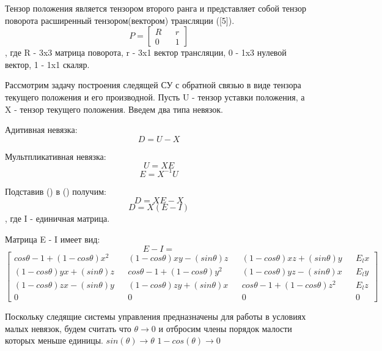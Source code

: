 \documentclass[a4paper]{article}
\begin{document}
Тензор положения является тензором второго ранга и представляет собой тензор поворота расширенный тензором(вектором) трансляции ([5]).
\begin{equation}
P = \begin{bmatrix}R&&r\\0&&1\end{bmatrix}
\end{equation}
, где R - 3x3 матрица поворота, r - 3x1 вектор трансляции, 0 - 1x3 нулевой вектор, 1 - 1x1 скаляр.  

Рассмотрим задачу построения следящей СУ с обратной связью в виде тензора текущего положения и его производной. 
Пусть U - тензор уставки положения, а X - тензор текущего положения.
Введем два типа невязок.

Адитивная невязка:
\begin{equation}
D = U - X
\end{equation}

Мультпликативная невязка:
\begin{equation} U = XE 		\end{equation}
\begin{equation} E = X^{-1}U 	\end{equation}

Подставив () в () получим:
\begin{equation} D = XE - X 	\end{equation}
\begin{equation} D = X(E - I)	\end{equation}
, где I - единичная матрица.

Матрица E - I имеет вид:
\begin{equation*} E - I = \end{equation*}
\begin{equation} 
\begin{bmatrix}
cos\theta-1+(1-cos\theta)x^2   && (1-cos\theta)xy-(sin\theta)z && (1-cos\theta)xz + (sin\theta)y && E_lx\\
(1-cos\theta)yx+(sin\theta)z && cos\theta-1+(1-cos\theta)y^2   && (1-cos\theta)yz - (sin\theta)x && E_ly\\
(1-cos\theta)zx-(sin\theta)y && (1-cos\theta)zy+(sin\theta)x && cos\theta-1+(1-cos\theta)z^2	   && E_lz\\
0&&0&&0&&0
\end{bmatrix}
\end{equation}

Поскольку следящие системы управления предназначены для работы в условиях малых невязок, будем считать что $\theta \rightarrow 0$ и отбросим члены порядок малости которых меньше единицы.
$sin(\theta) \rightarrow \theta$
$1 - cos(\theta) \rightarrow 0$
\end{document}
